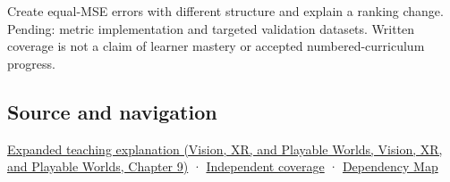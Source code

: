 Create equal-MSE errors with different structure and explain a ranking change. Pending: metric implementation and targeted validation datasets. Written coverage is not a claim of learner mastery or accepted numbered-curriculum progress.

\subsection{Source and navigation}\label{appendix-b2c1846508bf-source-and-navigation}

\href{../07-Vision-XR-and-Playable-Worlds/main.pdf\#nameddest=04-visual-computing-ii-ch042-quality-numbers-need-a-question-they-can-actually-answer}{Expanded teaching explanation (Vision, XR, and Playable Worlds, Vision, XR, and Playable Worlds, Chapter 9)} · \hyperref[appendix-fd090d982a15-xr01---independent-seeing-and-representation-source]{Independent coverage} · \hyperref[appendix-4ad47bdd269a]{Dependency Map}
